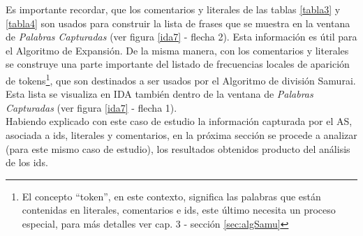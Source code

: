 Es importante recordar, que los comentarios y literales de las tablas \ref{tabla3} y \ref{tabla4} son usados para construir la lista de frases que se muestra en la ventana de \textit{Palabras Capturadas} (ver figura \ref{ida7} - flecha 2). Esta información es útil para el Algoritmo de Expansión. De la misma manera, con los comentarios y literales se construye una parte importante del listado de frecuencias locales de aparición de tokens\footnote[2]{El concepto “token”, en este contexto, significa las palabras que están contenidas en literales, comentarios e ids, este último necesita un proceso especial, para más detalles ver cap. 3 - sección \ref{sec:algSamu}}, que son destinados a ser usados por el Algoritmo de división Samurai. Esta lista se visualiza en IDA también dentro de la ventana de \textit{Palabras Capturadas} (ver figura \ref{ida7} - flecha 1).\\

Habiendo explicado con este caso de estudio la información capturada por el AS, asociada a ids, literales y comentarios, en la próxima sección se procede a analizar (para este mismo caso de estudio), los resultados obtenidos producto del análisis de los ids. 

